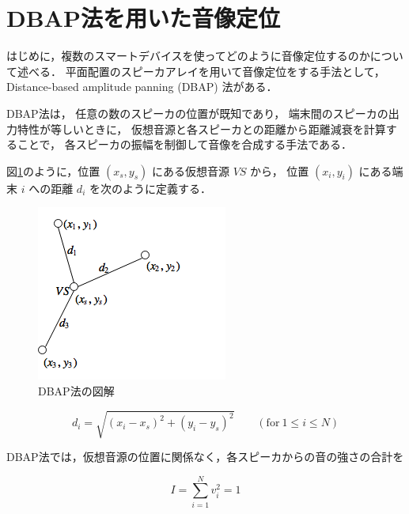 
\section{DBAP法を用いた音像定位}

はじめに，複数のスマートデバイスを使ってどのように音像定位するのかについて述べる．
平面配置のスピーカアレイを用いて音像定位をする手法として，
Distance-based amplitude panning (DBAP) 法\cite{dbap}がある．

DBAP法は，
任意の数のスピーカの位置が既知であり，
端末間のスピーカの出力特性が等しいときに，
仮想音源と各スピーカとの距離から距離減衰を計算することで，
各スピーカの振幅を制御して音像を合成する手法である．

図\ref{fig:DBAP}のように，位置 $(x_s,y_s)$ にある仮想音源 $VS$ から，
位置 $(x_i,y_i)$ にある端末 $i$ への距離 $d_i$ を次のように定義する．

\begin{figure}[p]\centering
  \hspace{-2mm}\includegraphics[clip,width=1.1\hsize]{img/DBAP.png}
  \caption{DBAP法の図解}\label{fig:DBAP}
\end{figure}

$$
d_i = \sqrt{(x_i - x_s)^2 + (y_i - y_s)^2} \qquad (\mathrm{for}\ 1 \leq i \leq N)
$$

DBAP法では，仮想音源の位置に関係なく，各スピーカからの音の強さの合計を

$$
I = \sum_{i=1}^N v_i^2 = 1
$$

